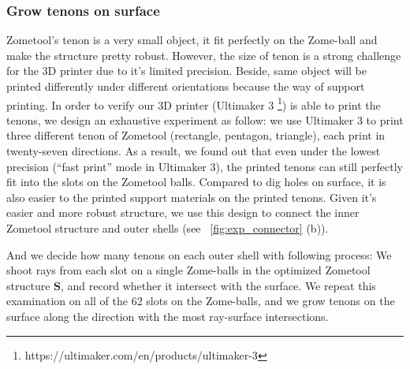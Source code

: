 \subsubsection{Grow tenons on surface}
Zometool's tenon is a very small object, it fit perfectly on the Zome-ball and make the structure pretty robust. 
However, the size of tenon is a strong challenge for the 3{D} printer due to it's limited precision. 
Beside, same object will be printed differently under different orientations because the way of support printing.
In order to verify our 3{D} printer (Ultimaker 3 \footnote{https://ultimaker.com/en/products/ultimaker-3}) is able to print the tenons, we design an exhaustive experiment as follow:
we use Ultimaker 3 to print three different tenon of Zometool (rectangle, pentagon, triangle), each print in twenty-seven directions. 
As a result, we found out that even under the lowest precision (``fast print'' mode in Ultimaker 3), the printed tenons can still perfectly fit into the slots on the Zometool balls.
Compared to dig holes on  surface, it is also easier to  the printed support materials on the printed tenons.
Given it's easier  and more robust structure, we use this design to connect the inner Zometool structure and outer shells (see \figname~\ref{fig:exp_connector} (b)). 

And we decide how many tenons on each outer shell with  following process:
We shoot rays from each slot on a single Zome-balls in the optimized Zometool structure $\mathbf{S}$, and record whether it intersect with the surface.
We repeat this examination on all of the 62 slots on the Zome-balls, and we grow tenons on the surface along the direction with the most ray-surface intersections.

